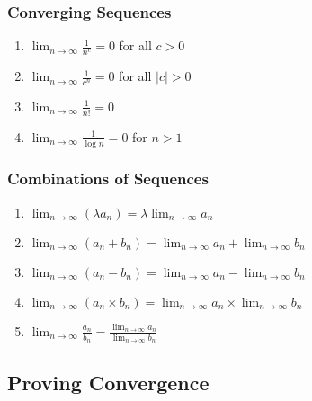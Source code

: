 \documentclass[10pt,twoside,twocolumn]{article}
\begin{document}
\subsubsection{Converging Sequences}
\begin{enumerate}
\item $\lim_{n\rightarrow\infty}\frac{1}{n^{c}}=0$ for all $c>0$ 
\item $\lim_{n\rightarrow\infty}\frac{1}{c^{n}}=0$ for all $\left|c\right|>0$ 
\item $\lim_{n\rightarrow\infty}\frac{1}{n!}=0$ 
\item $\lim_{n\rightarrow\infty}\frac{1}{\log n}=0$ for $n>1$ 
\end{enumerate}

\subsubsection{Combinations of Sequences}
\begin{enumerate}
\item $\lim_{n\rightarrow\infty}\left(\lambda a_{n}\right)=\lambda\lim_{n\rightarrow\infty}a_{n}$ 
\item $\lim_{n\rightarrow\infty}\left(a_{n}+b_{n}\right)=\lim_{n\rightarrow\infty}a_{n}+\lim_{n\rightarrow\infty}b_{n}$ 
\item $\lim_{n\rightarrow\infty}\left(a_{n}-b_{n}\right)=\lim_{n\rightarrow\infty}a_{n}-\lim_{n\rightarrow\infty}b_{n}$ 
\item $\lim_{n\rightarrow\infty}\left(a_{n}\times b_{n}\right)=\lim_{n\rightarrow\infty}a_{n}\times\lim_{n\rightarrow\infty}b_{n}$ 
\item $\lim_{n\rightarrow\infty}\frac{a_{n}}{b_{n}}=\frac{\lim_{n\rightarrow\infty}a_{n}}{\lim_{n\rightarrow\infty}b_{n}}$ 
\end{enumerate}

\subsection{Proving Convergence}
\end{document}

